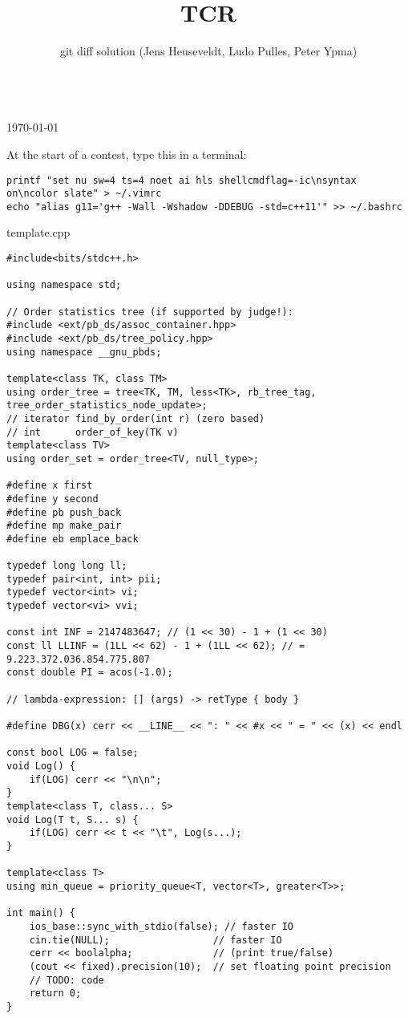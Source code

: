 \documentclass{article}
\title{TCR}
\author{git diff solution (Jens Heuseveldt, Ludo Pulles, Peter Ypma)}
\begin{document}
\maketitle
\begin{center}
	\makeatletter
	\textbf{\@title} \\
	\today \\
	\emph{\@author}
	\makeatother
\end{center}

\tableofcontents

\begin{center}
At the start of a contest, type this in a terminal:
\end{center}

\begin{lstlisting}
printf "set nu sw=4 ts=4 noet ai hls shellcmdflag=-ic\nsyntax on\ncolor slate" > ~/.vimrc
echo "alias g11='g++ -Wall -Wshadow -DDEBUG -std=c++11'" >> ~/.bashrc
\end{lstlisting}

\begin{center}
template.cpp
\end{center}

\begin{lstlisting}
#include<bits/stdc++.h>

using namespace std;

// Order statistics tree (if supported by judge!):
#include <ext/pb_ds/assoc_container.hpp>
#include <ext/pb_ds/tree_policy.hpp>
using namespace __gnu_pbds;

template<class TK, class TM>
using order_tree = tree<TK, TM, less<TK>, rb_tree_tag, tree_order_statistics_node_update>;
// iterator	find_by_order(int r) (zero based)
// int		order_of_key(TK v)
template<class TV>
using order_set = order_tree<TV, null_type>;

#define x first
#define y second
#define pb push_back
#define mp make_pair
#define eb emplace_back

typedef long long ll;
typedef pair<int, int> pii;
typedef vector<int> vi;
typedef vector<vi> vvi;

const int INF = 2147483647; // (1 << 30) - 1 + (1 << 30)
const ll LLINF = (1LL << 62) - 1 + (1LL << 62); // = 9.223.372.036.854.775.807
const double PI = acos(-1.0);

// lambda-expression: [] (args) -> retType { body }

#define DBG(x) cerr << __LINE__ << ": " << #x << " = " << (x) << endl

const bool LOG = false;
void Log() {
	if(LOG) cerr << "\n\n";
}
template<class T, class... S>
void Log(T t, S... s) {
	if(LOG) cerr << t << "\t", Log(s...);
}

template<class T>
using min_queue = priority_queue<T, vector<T>, greater<T>>;

int main() {
	ios_base::sync_with_stdio(false); // faster IO
	cin.tie(NULL);					// faster IO
	cerr << boolalpha;				// (print true/false)
	(cout << fixed).precision(10);	// set floating point precision
	// TODO: code
	return 0;
}
\end{lstlisting}
\end{document}
